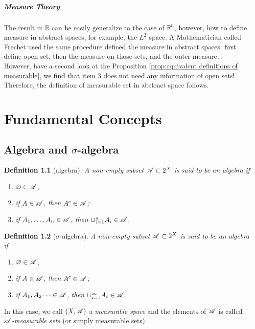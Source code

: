 \documentclass[12pt,a4paper]{report}
\numberwithin{equation}{section}
\theoremstyle{mystyle}
\newtheorem{definition}{Definition}[section]
\newcommand{\R}{\mathbb{R}}
\let\emptyset\varnothing
\begin{document}
	
	\paragraph{Measure Theory}
	The result in $\R$ can be easily generalize to the case of $\R^n$, however, how to define measure in abstract spaces, for example,  the $L^2$ space. A Mathematician called Frechet used the same procedure defined the measure in abstract spaces: first define open set, then the measure on those sets, and the outer measure... However, have a second look at the Proposition \ref{prop:equivalent definitions of measurable}, we find that item 3 does not need any information of open sets! Therefore, the definition of measurable set in abstract space follows.
	
	
	
	
	
	
	
	\chapter{Fundamental Concepts}
	\section{Algebra and $\sigma$-algebra}
	\begin{definition}[algebra]
		A non-empty subset $\mathscr{A}\subset 2^X$ is said to be an \emph{algebra} if
		\begin{enumerate}
			\item $\emptyset \in \A$,
			\item if $A\in \mathscr{A}$, then $A^c\in \mathscr{A}$;
			\item if $A_1,\dots,A_n\in \mathscr{A}$, then $\cup_{i=1}^n A_i\in \mathscr{A}$.
		\end{enumerate}
	\end{definition}
	
	\begin{definition}[$\sigma$-algebra]
		A non-empty subset $\mathscr{A}\subset 2^X$ is said to be an \emph{algebra} if
		\begin{enumerate}
			\item $\emptyset \in \A$,
			\item if $A\in \mathscr{A}$, then $A^c\in \mathscr{A}$;
			\item if $A_1,A_2\dots\in \mathscr{A}$, then $\cup_{i=1}^\infty A_i\in \mathscr{A}$.
		\end{enumerate}
	\end{definition}
	In this case, we call $(X,\mathscr{A})$ a \emph{measurable space} and the elements of $\mathscr{A}$ is called \emph{$\mathscr{A}$-measurable sets} (or simply measurable sets).
	
\end{document}
